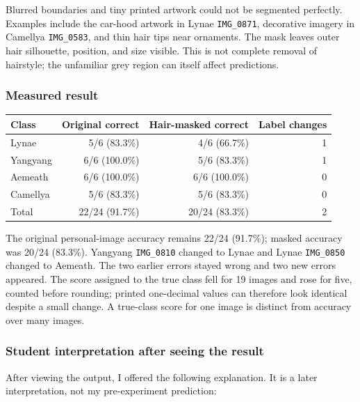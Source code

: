 \documentclass[11pt]{article}
\begin{document}
Blurred boundaries and tiny printed artwork could not be segmented perfectly. Examples include the car-hood artwork in Lynae \texttt{IMG\_0871}, decorative imagery in Camellya \texttt{IMG\_0583}, and thin hair tips near ornaments. The mask leaves outer hair silhouette, position, and size visible. This is not complete removal of hairstyle; the unfamiliar grey region can itself affect predictions.

\subsubsection*{Measured result}
\begin{center}\small
\begin{tabular}{lrrr}
\toprule
Class & Original correct & Hair-masked correct & Label changes \\
\midrule

Lynae & 5/6 (83.3\%) & 4/6 (66.7\%) & 1 \\

Yangyang & 6/6 (100.0\%) & 5/6 (83.3\%) & 1 \\

Aemeath & 6/6 (100.0\%) & 6/6 (100.0\%) & 0 \\

Camellya & 5/6 (83.3\%) & 5/6 (83.3\%) & 0 \\

Total & 22/24 (91.7\%) & 20/24 (83.3\%) & 2 \\

\bottomrule
\end{tabular}
\end{center}
The original personal-image accuracy remains 22/24 (91.7\%); masked accuracy was 20/24 (83.3\%). Yangyang \texttt{IMG\_0810} changed to Lynae and Lynae \texttt{IMG\_0850} changed to Aemeath. The two earlier errors stayed wrong and two new errors appeared. The score assigned to the true class fell for 19 images and rose for five, counted before rounding; printed one-decimal values can therefore look identical despite a small change. A true-class score for one image is distinct from accuracy over many images.

\subsubsection*{Student interpretation after seeing the result}
After viewing the output, I offered the following explanation. It is a later interpretation, not my pre-experiment prediction:
\end{document}

